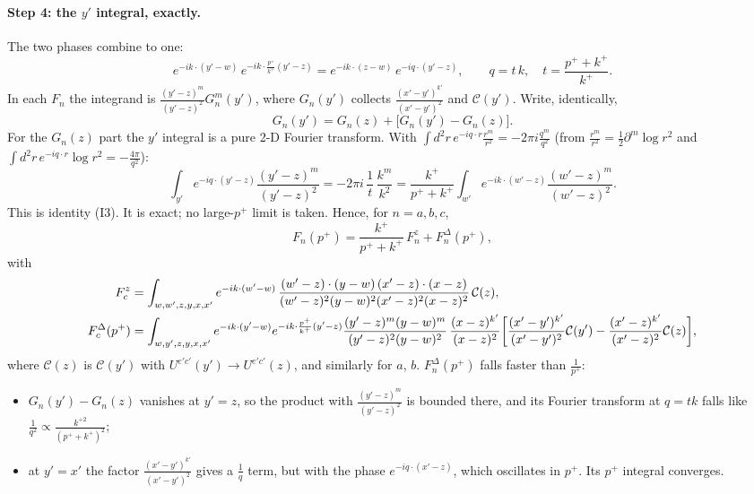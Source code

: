 \documentclass[10pt]{article}
\numberwithin{equation}{section}
\begin{document}
\paragraph{Step 4: the $y'$ integral, exactly.} The two phases combine to one:
\begin{equation}
e^{-ik\cdot (y'-w)}\,e^{-ik\cdot\frac{p^+}{k^+}(y'-z)}=e^{-ik\cdot(z-w)}\,e^{-iq\cdot(y'-z)},\qquad q=t\,k,\quad t=\frac{p^++k^+}{k^+}.
\end{equation}
In each $F_n$ the integrand is $\frac{(y'-z)^m}{(y'-z)^2}G_n^m(y')$, where $G_n(y')$ collects $\frac{(x'-y')^{k'}}{(x'-y')^2}$ and $\mathcal C(y')$. Write, identically,
\begin{equation}
G_n(y')=G_n(z)+\big[G_n(y')-G_n(z)\big].
\label{eq:split}
\end{equation}
For the $G_n(z)$ part the $y'$ integral is a pure 2-D Fourier transform. With $\int d^2r\,e^{-iq\cdot r}\frac{r^m}{r^2}=-2\pi i\frac{q^m}{q^2}$ (from $\frac{r^m}{r^2}=\frac12\partial^m\log r^2$ and $\int d^2r\,e^{-iq\cdot r}\log r^2=-\frac{4\pi}{q^2}$):
\begin{equation}
\int_{y'}e^{-iq\cdot(y'-z)}\frac{(y'-z)^m}{(y'-z)^2}=-2\pi i\,\frac{1}{t}\,\frac{k^m}{k^2}=\frac{k^+}{p^++k^+}\int_{w'}e^{-ik\cdot(w'-z)}\frac{(w'-z)^m}{(w'-z)^2}.
\label{eq:I3}
\end{equation}
This is identity (I3). It is exact; no large-$p^+$ limit is taken. Hence, for $n=a,b,c$,
\begin{equation}
F_n(p^+)=\frac{k^+}{p^++k^+}\,F_n^{z}+F_n^{\Delta}(p^+),
\label{eq:Fsplit}
\end{equation}
with
\begin{align}
F_c^{z}&=\int_{w,w',z,y,x,x'}e^{-ik\cdot (w'-w)}\,\frac{(w'-z)\cdot (y-w)\,(x'-z)\cdot (x-z)}{(w'-z)^{2}(y-w)^{2}(x'-z)^{2}(x-z)^{2}}\,\mathcal C(z),\notag\\
F_c^{\Delta}(p^+)&=\int_{w,y',z,y,x,x'}e^{-ik\cdot (y'-w)}e^{-ik\cdot\frac{p^+}{k^+}(y'-z)}\frac{(y'-z)^m(y-w)^m}{(y'-z)^2(y-w)^2}\,\frac{(x-z)^{k'}}{(x-z)^2}\bigg[\frac{(x'-y')^{k'}}{(x'-y')^2}\mathcal C(y')-\frac{(x'-z)^{k'}}{(x'-z)^2}\mathcal C(z)\bigg],
\label{eq:Fc}
\end{align}
where $\mathcal C(z)$ is $\mathcal C(y')$ with $U^{e'c'}(y')\to U^{e'c'}(z)$, and similarly for $a$, $b$. $F_n^{\Delta}(p^+)$ falls faster than $\frac{1}{p^+}$:
\begin{itemize}
\item $G_n(y')-G_n(z)$ vanishes at $y'=z$, so the product with $\frac{(y'-z)^m}{(y'-z)^2}$ is bounded there, and its Fourier transform at $q=tk$ falls like $\frac{1}{q^2}\propto\frac{k^{+2}}{(p^++k^+)^2}$;
\item at $y'=x'$ the factor $\frac{(x'-y')^{k'}}{(x'-y')^2}$ gives a $\frac{1}{q}$ term, but with the phase $e^{-iq\cdot(x'-z)}$, which oscillates in $p^+$. Its $p^+$ integral converges.
\end{itemize}
\end{document}
